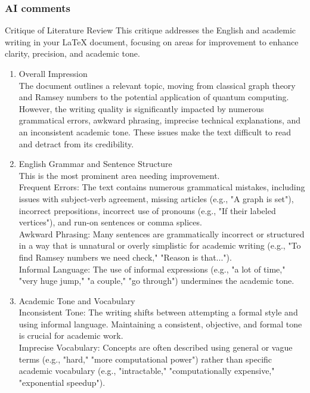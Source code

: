 \documentclass{Assignment}
\begin{document}
\subsubsection*{AI comments}
Critique of Literature Review
This critique addresses the English and academic writing in your LaTeX document, focusing on areas for improvement to enhance clarity, precision, and academic tone.
\\
\begin{enumerate}

\item Overall Impression
\\
The document outlines a relevant topic, moving from classical graph theory and Ramsey numbers to the potential application of quantum computing. However, the writing quality is significantly impacted by numerous grammatical errors, awkward phrasing, imprecise technical explanations, and an inconsistent academic tone. These issues make the text difficult to read and detract from its credibility.
\\
\item English Grammar and Sentence Structure
\\
This is the most prominent area needing improvement.
\\
Frequent Errors: The text contains numerous grammatical mistakes, including issues with subject-verb agreement, missing articles (e.g., "A graph is set"), incorrect prepositions, incorrect use of pronouns (e.g., "If their labeled vertices"), and run-on sentences or comma splices.
\\
Awkward Phrasing: Many sentences are grammatically incorrect or structured in a way that is unnatural or overly simplistic for academic writing (e.g., "To find Ramsey numbers we need check," "Reason is that...").
\\
Informal Language: The use of informal expressions (e.g., "a lot of time," "very huge jump," "a couple," "go through") undermines the academic tone.
\\
\item Academic Tone and Vocabulary
\\
Inconsistent Tone: The writing shifts between attempting a formal style and using informal language. Maintaining a consistent, objective, and formal tone is crucial for academic work.
\\
Imprecise Vocabulary: Concepts are often described using general or vague terms (e.g., "hard," "more computational power") rather than specific academic vocabulary (e.g., "intractable," "computationally expensive," "exponential speedup").

\end{enumerate}
\end{document}
